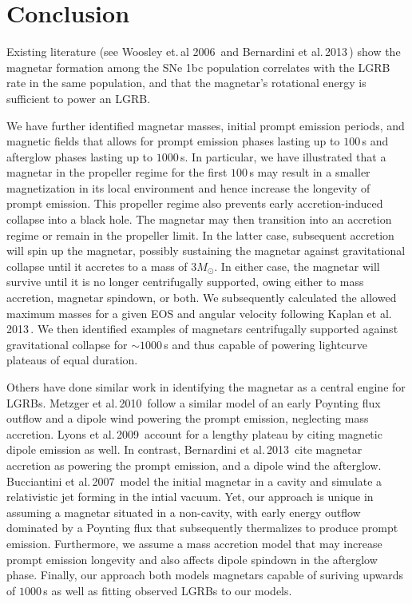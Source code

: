\documentclass{article}
\begin{document}
\section{Conclusion} \label{sec:conc}

Existing literature (see Woosley et.\,al 2006\,\cite{Woosley:2006fn} and Bernardini et al.\,2013\,\cite{Bernardini:2013nfa}) show the magnetar formation among the SNe 1bc population correlates with the LGRB rate in the same population, and that the magnetar's rotational energy is sufficient to power an LGRB.

We have further identified magnetar masses, initial prompt emission periods, and magnetic fields that allows for prompt emission phases lasting up to $100$\,s and afterglow phases lasting up to $1000$\,s. In particular, we have illustrated that a magnetar in the propeller regime for the first $100$\,s may result in a smaller magnetization in its local environment and hence increase the longevity of prompt emission. This propeller regime also prevents early accretion-induced collapse into a black hole. The magnetar may then transition into an accretion regime or remain in the propeller limit. In the latter case, subsequent accretion will spin up the magnetar, possibly sustaining the magnetar against gravitational collapse until it accretes to a mass of $3M_{\odot}$. In either case, the magnetar will survive until it is no longer centrifugally supported, owing either to mass accretion, magnetar spindown, or both. We subsequently calculated the allowed maximum masses for a given EOS and angular velocity following Kaplan et al.\,2013\,\cite{Kaplan:2013wra}. We then identified examples of magnetars centrifugally supported against gravitational collapse for $\sim 1000$\,s and thus capable of powering lightcurve plateaus of equal duration.

Others have done similar work in identifying the magnetar as a central engine for LGRBs. Metzger et al.\,2010\,\cite{Metzger:2010pp} follow a similar model of an early Poynting flux outflow and a dipole wind powering the prompt emission, neglecting mass accretion. Lyons et al.\,2009\,\cite{Lyons:2009ka} account for a lengthy plateau by citing magnetic dipole emission as well. In contrast, Bernardini et al.\,2013\,\cite{Bernardini:2013nfa} cite magnetar accretion as powering the prompt emission, and a dipole wind the afterglow. Bucciantini et al.\,2007\,\cite{Bucciantini:2007hy} model the initial magnetar in a cavity and simulate a relativistic jet forming in the intial vacuum. Yet, our approach is unique in assuming a magnetar situated in a non-cavity, with early energy outflow dominated by a Poynting flux that subsequently thermalizes to produce prompt emission. Furthermore, we assume a mass accretion model that may increase prompt emission longevity and also affects dipole spindown in the afterglow phase. Finally, our approach both models magnetars capable of suriving upwards of $1000$\,s as well as fitting observed LGRBs to our models.
\end{document}
